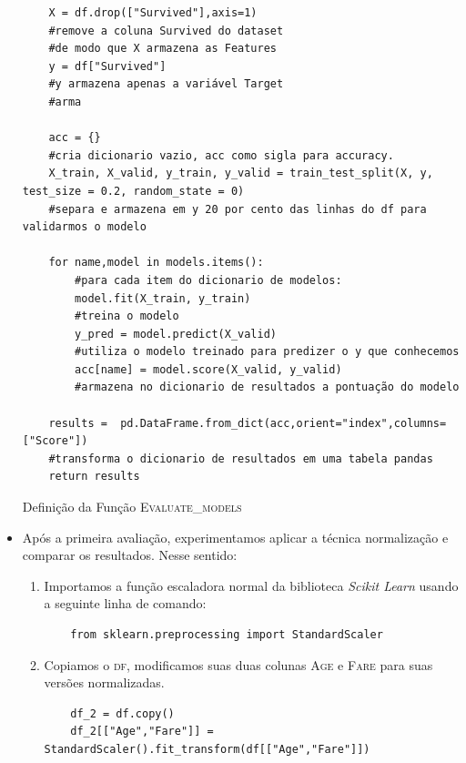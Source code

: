 \documentclass{article}
\begin{document}
\begin{itemize}
\begin{listing}[!ht]
\begin{verbatim}
    X = df.drop(["Survived"],axis=1)
    #remove a coluna Survived do dataset
    #de modo que X armazena as Features 
    y = df["Survived"]
    #y armazena apenas a variável Target
    #arma

    acc = {} 
    #cria dicionario vazio, acc como sigla para accuracy.
    X_train, X_valid, y_train, y_valid = train_test_split(X, y, test_size = 0.2, random_state = 0)
    #separa e armazena em y 20 por cento das linhas do df para validarmos o modelo
    
    for name,model in models.items():
        #para cada item do dicionario de modelos: 
        model.fit(X_train, y_train)
        #treina o modelo 
        y_pred = model.predict(X_valid)
        #utiliza o modelo treinado para predizer o y que conhecemos 
        acc[name] = model.score(X_valid, y_valid)
        #armazena no dicionario de resultados a pontuação do modelo
    
    results =  pd.DataFrame.from_dict(acc,orient="index",columns=["Score"])
    #transforma o dicionario de resultados em uma tabela pandas
    return results
\end{verbatim}
\caption{Definição da Função \textsc{Evaluate\_models}}
\label{list2}
\end{listing}

\item Após a primeira avaliação, experimentamos aplicar a técnica normalização e comparar os resultados. Nesse sentido:
\begin{enumerate}
    \item Importamos a função escaladora normal da biblioteca \emph{Scikit Learn} usando a seguinte linha de comando:
    \begin{verbatim}
    from sklearn.preprocessing import StandardScaler
    \end{verbatim}
    \item Copiamos o \textsc{df}, modificamos suas duas colunas \textsc{Age} e \textsc{Fare} para suas versões normalizadas. 
    \begin{verbatim}
    df_2 = df.copy()
    df_2[["Age","Fare"]] = StandardScaler().fit_transform(df[["Age","Fare"]])
    \end{verbatim}
\end{enumerate}
\end{itemize}

\end{document}
